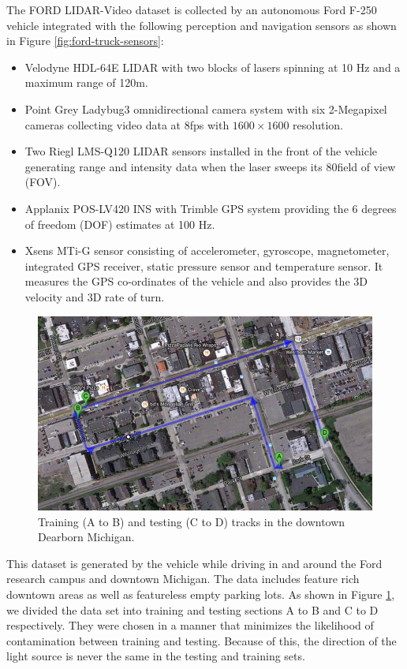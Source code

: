 \documentclass{article}
\begin{document}
The FORD LIDAR-Video dataset \cite{Pandey2011Ford-campu} is collected by an autonomous Ford F-250 vehicle integrated with the following perception and navigation sensors as shown in Figure \ref{fig:ford-truck-sensors}:
\begin{itemize}
    \item Velodyne HDL-64E LIDAR with two blocks of lasers spinning at 10 Hz and a maximum range of 120m.
    \item Point Grey Ladybug3 omnidirectional camera system with six 2-Megapixel cameras collecting video data at 8fps with $1600\times1600$ resolution.
    \item Two Riegl LMS-Q120 LIDAR sensors installed in the front of the vehicle generating range and intensity data when the laser sweeps its 80\degree field of view (FOV).
    \item Applanix POS-LV420 INS with Trimble GPS system providing the 6 degrees of freedom (DOF) estimates at 100 Hz.
    \item Xsens MTi-G sensor consisting of accelerometer, gyroscope, magnetometer, integrated GPS receiver, static pressure sensor and temperature sensor. It measures the GPS co-ordinates of the vehicle and also provides the 3D velocity and 3D rate of turn.
\end{itemize}

\begin{figure}[htbp]
    \centering
        \includegraphics[scale=0.35]{Figures/ford_train_test_track.jpg}
    \caption{Training (A to B) and testing (C to D) tracks in the downtown Dearborn Michigan.}
    \label{fig:ford_train_test_track}
\end{figure}

This dataset is generated by the vehicle while driving in and around the Ford research campus and downtown Michigan. The data includes feature rich downtown areas as well as featureless empty parking lots. As shown in Figure \ref{fig:ford_train_test_track}, we divided the data set into training and testing sections A to B and C to D respectively. They were chosen in a manner that minimizes the likelihood of contamination between training and testing. Because of this, the direction of the light source is never the same in the testing and training sets. %
\end{document}

